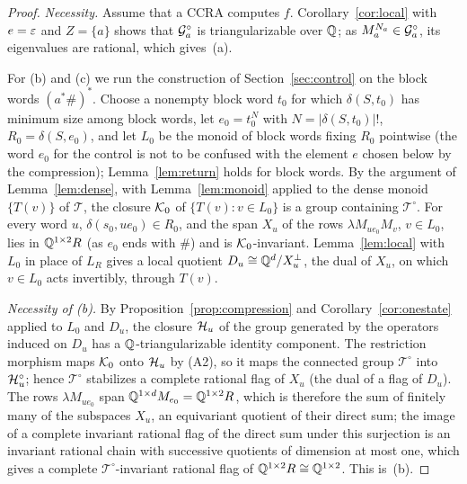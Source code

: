 \begin{proof}
\emph{Necessity.} Assume that a CCRA computes $f$. Corollary~\ref{cor:local} with $e=\varepsilon$ and $Z=\{a\}$ shows that $\mathcal{G}_a^\circ$ is triangularizable over $\mathbb{Q}$; as $M_a^{N_a}\in\mathcal{G}_a^\circ$, its eigenvalues are rational, which gives~(a).

For (b) and (c) we run the construction of Section~\ref{sec:control} on the block words $(a^*\#)^*$. Choose a nonempty block word $t_0$ for which $\delta(S,t_0)$ has minimum size among block words, let $e_0=t_0^{N}$ with $N=|\delta(S,t_0)|!$, $R_0=\delta(S,e_0)$, and let $L_0$ be the monoid of block words fixing $R_0$ pointwise (the word $e_0$ for the control is not to be confused with the element $e$ chosen below by the compression); Lemma~\ref{lem:return} holds for block words. By the argument of Lemma~\ref{lem:dense}, with Lemma~\ref{lem:monoid} applied to the dense monoid $\{T(v)\}$ of $\mathcal T$, the closure $\mathcal{K}_0$ of $\{T(v):v\in L_0\}$ is a group containing $\mathcal T^\circ$. For every word $u$, $\delta(s_0,ue_0)\in R_0$, and the span $X_u$ of the rows $\lambda M_{ue_0}M_v$, $v\in L_0$, lies in $\mathbb{Q}^{1\times2}R$ (as $e_0$ ends with $\#$) and is $\mathcal{K}_0$-invariant. Lemma~\ref{lem:local} with $L_0$ in place of $L_R$ gives a local quotient $D_u\cong\mathbb{Q}^d/X_u^\perp$, the dual of $X_u$, on which $v\in L_0$ acts invertibly, through $T(v)$.

\emph{Necessity of (b).} By Proposition~\ref{prop:compression} and Corollary~\ref{cor:onestate} applied to $L_0$ and $D_u$, the closure $\mathcal{H}_u$ of the group generated by the operators induced on $D_u$ has a $\mathbb{Q}$-triangularizable identity component. The restriction morphism maps $\mathcal{K}_0$ onto $\mathcal{H}_u$ by (A2), so it maps the connected group $\mathcal T^\circ$ into $\mathcal{H}_u^\circ$; hence $\mathcal T^\circ$ stabilizes a complete rational flag of $X_u$ (the dual of a flag of $D_u$). The rows $\lambda M_{ue_0}$ span $\mathbb{Q}^{1\times d}M_{e_0}=\mathbb{Q}^{1\times2}R$, which is therefore the sum of finitely many of the subspaces $X_u$, an equivariant quotient of their direct sum; the image of a complete invariant rational flag of the direct sum under this surjection is an invariant rational chain with successive quotients of dimension at most one, which gives a complete $\mathcal T^\circ$-invariant rational flag of $\mathbb{Q}^{1\times2}R\cong\mathbb{Q}^{1\times2}$. This is~(b).


\end{proof}
